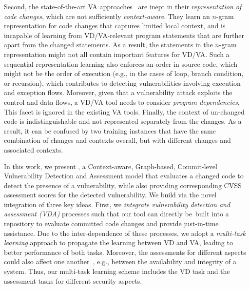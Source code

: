 Second, the state-of-the-art VA approaches~\cite{deepCVA-ase21} are
inept in their {\em representation of code changes},
which are not sufficiently {\em context-aware}.
They learn an $n$-gram
representation for code changes that captures limited local context,
and is incapable of learning from VD/VA-relevant program statements
that are further apart from the changed statements.  As a result, the
statements in the $n$-gram representation might not all contain
important features for VD/VA. Such a sequential representation
learning also enforces an order in source code, which might not be the
order of execution (e.g., in the cases of loop, branch condition, or
recursion), which contributes to detecting vulnerabilities involving
execution and exception flows. Moreover, given that a vulnerability
attack exploits the control and data flows, a VD/VA tool needs to
consider {\em program dependencies}.  This facet is ignored
in the existing VA tools.
Finally, the context of un-changed code is indistinguishable and not
represented separately from the changes. As a result, it can be
confused by two training instances that have the same combination
of changes and contexts overall, but with different changes and
associated contexts.

In this work, we present {\tool}, a Context-aware, Graph-based,
Commit-level Vulnerability Detection and Assessment model that
evaluates a changed code to detect the presence of a vulnerability,
while also providing corresponding CVSS assessment scores for the
detected vulnerability. We build {\tool} via the novel integration of
three key ideas.  First, we {\em integrate vulnerability detection and
  assessment (VDA)} processes such that our tool can directly be~built
into a repository to evaluate committed code changes and provide
just-in-time assistance. Due to the inter-dependence of these
processes, we adopt a {\em multi-task learning} approach to propagate
the learning between VD and VA, leading to better performance of both
tasks. Moreover, the assessments for different aspects could also
affect one another~\cite{deepCVA-ase21}, e.g., between the
availability and integrity of a system. Thus, our multi-task learning
scheme includes the VD task and the assessment tasks for different
security aspects.

